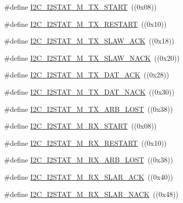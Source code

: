 \begin{DoxyCompactItemize}
\item 
\#define \hyperlink{group___i2_c___private___macros_ga5c44c05176052f6040cd40d680bc2a91}{I2\+C\+\_\+\+I2\+S\+T\+A\+T\+\_\+\+M\+\_\+\+T\+X\+\_\+\+S\+T\+A\+RT}~((0x08))
\item 
\#define \hyperlink{group___i2_c___private___macros_gad41d0d1392b7d905b22b9c5015f2e48f}{I2\+C\+\_\+\+I2\+S\+T\+A\+T\+\_\+\+M\+\_\+\+T\+X\+\_\+\+R\+E\+S\+T\+A\+RT}~((0x10))
\item 
\#define \hyperlink{group___i2_c___private___macros_gab91c158252efeb1a3a139faec3622ae0}{I2\+C\+\_\+\+I2\+S\+T\+A\+T\+\_\+\+M\+\_\+\+T\+X\+\_\+\+S\+L\+A\+W\+\_\+\+A\+CK}~((0x18))
\item 
\#define \hyperlink{group___i2_c___private___macros_ga15729d9436fbf4c23a22e7cdbc913552}{I2\+C\+\_\+\+I2\+S\+T\+A\+T\+\_\+\+M\+\_\+\+T\+X\+\_\+\+S\+L\+A\+W\+\_\+\+N\+A\+CK}~((0x20))
\item 
\#define \hyperlink{group___i2_c___private___macros_gad8c325e3c58aa8e7810797b9a6761596}{I2\+C\+\_\+\+I2\+S\+T\+A\+T\+\_\+\+M\+\_\+\+T\+X\+\_\+\+D\+A\+T\+\_\+\+A\+CK}~((0x28))
\item 
\#define \hyperlink{group___i2_c___private___macros_ga234f86990a6fd63f1d2064cbca4709a3}{I2\+C\+\_\+\+I2\+S\+T\+A\+T\+\_\+\+M\+\_\+\+T\+X\+\_\+\+D\+A\+T\+\_\+\+N\+A\+CK}~((0x30))
\item 
\#define \hyperlink{group___i2_c___private___macros_ga79230136402441c7e233c63fd2f71bdf}{I2\+C\+\_\+\+I2\+S\+T\+A\+T\+\_\+\+M\+\_\+\+T\+X\+\_\+\+A\+R\+B\+\_\+\+L\+O\+ST}~((0x38))
\item 
\#define \hyperlink{group___i2_c___private___macros_gab1f79137c62e306269633b005ad936da}{I2\+C\+\_\+\+I2\+S\+T\+A\+T\+\_\+\+M\+\_\+\+R\+X\+\_\+\+S\+T\+A\+RT}~((0x08))
\item 
\#define \hyperlink{group___i2_c___private___macros_gacb1c9145acd64a77464017f1dd9279c5}{I2\+C\+\_\+\+I2\+S\+T\+A\+T\+\_\+\+M\+\_\+\+R\+X\+\_\+\+R\+E\+S\+T\+A\+RT}~((0x10))
\item 
\#define \hyperlink{group___i2_c___private___macros_gaed32dea40cf84a1efb09e0c389579163}{I2\+C\+\_\+\+I2\+S\+T\+A\+T\+\_\+\+M\+\_\+\+R\+X\+\_\+\+A\+R\+B\+\_\+\+L\+O\+ST}~((0x38))
\item 
\#define \hyperlink{group___i2_c___private___macros_gacd29e4a94f8a533477dbbf026c0d525a}{I2\+C\+\_\+\+I2\+S\+T\+A\+T\+\_\+\+M\+\_\+\+R\+X\+\_\+\+S\+L\+A\+R\+\_\+\+A\+CK}~((0x40))
\item 
\#define \hyperlink{group___i2_c___private___macros_gafe156febe3313a9f3423776f97d0f24f}{I2\+C\+\_\+\+I2\+S\+T\+A\+T\+\_\+\+M\+\_\+\+R\+X\+\_\+\+S\+L\+A\+R\+\_\+\+N\+A\+CK}~((0x48))

\end{DoxyCompactItemize}
